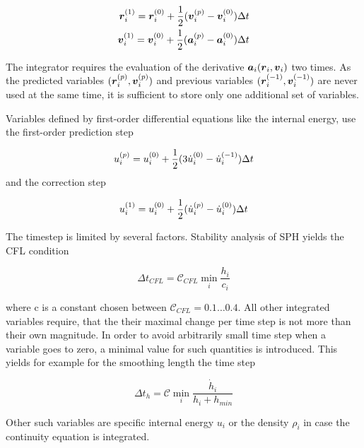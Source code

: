 \begin{eqnarray}
\label{ch02_sph02_eq020}
\boldsymbol{r}_i^{(1)} = \boldsymbol{r}_i^{(0)} + \frac{1}{2} ( \boldsymbol{v}_i^{(p)} - \boldsymbol{v}_i^{(0)} )\Delta t \\
\boldsymbol{v}_i^{(1)} = \boldsymbol{v}_i^{(0)} + \frac{1}{2} ( \boldsymbol{a}_i^{(p)} - \boldsymbol{a}_i^{(0)} )\Delta t
\end{eqnarray}

The integrator requires the evaluation of the derivative $\boldsymbol{a}_i( \boldsymbol{r}_i, \boldsymbol{v}_i)$ two times. As the predicted variables $(\boldsymbol{r}_i^{(p)}, \boldsymbol{v}_i^{(p)})$ and previous variables $(\boldsymbol{r}_i^{(-1)}, \boldsymbol{v}_i^{(-1)})$ are never used at the same time, it is sufficient to store only one additional set of variables.

Variables defined by first-order differential equations like the internal energy, use the first-order prediction step

\begin{equation}
\label{ch02_sph02_eq021}
u_i^{(p)} = u_i^{(0)} + \frac{1}{2} ( 3 \dot{u}_i^{(0)} - \dot{u}_i^{(-1)} )\Delta t \\
\end{equation}
and the correction step

\begin{equation}
\label{ch02_sph02_eq022}
u_i^{(1)} = u_i^{(0)} + \frac{1}{2} ( \dot{u}_i^{(p)} - \dot{u}_i^{(0)} )\Delta t \\
\end{equation}

The timestep is limited by several factors. Stability analysis of SPH yields the CFL condition 

\begin{equation}
\label{ch02_sph02_eq023}
\Delta t_{CFL} = \mathcal{C}_{CFL} \min_{i} \frac{h_i}{c_i}
\end{equation}

where c is a constant chosen between $\mathcal{C}_{CFL} = 0.1 \dots 0.4$. All other integrated variables require, that the their maximal change per time step is not more than their own magnitude. In order to avoid arbitrarily small time step when a variable goes to zero, a minimal value for such quantities is introduced. This yields for example for the smoothing length the time step

\begin{equation}
\label{ch02_sph02_eq024}
\Delta t_{h} = \mathcal{C} \min_{i} \frac{\dot{h}_i}{h_i + h_{min}}
\end{equation}

Other such variables are specific internal energy $u_i$ or the density $\rho_i$ in case the continuity equation is integrated. 


